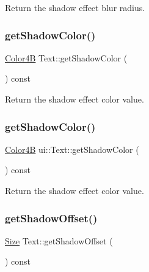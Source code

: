 Return the shadow effect blur radius. \mbox{\label{classui_1_1Text_a7f10cfa20f088433f478f7d87eaecbd5}} 
\subsubsection{\texorpdfstring{get\+Shadow\+Color()}{getShadowColor()}\hspace{0.1cm}{\footnotesize\ttfamily [1/2]}}
{\footnotesize\ttfamily \hyperlink{structColor4B}{Color4B} Text\+::get\+Shadow\+Color (\begin{DoxyParamCaption}{ }\end{DoxyParamCaption}) const}

Return the shadow effect color value. \mbox{\label{classui_1_1Text_a9db20ba9bf8aca14d1af3d4ab479378d}} 
\subsubsection{\texorpdfstring{get\+Shadow\+Color()}{getShadowColor()}\hspace{0.1cm}{\footnotesize\ttfamily [2/2]}}
{\footnotesize\ttfamily \hyperlink{structColor4B}{Color4B} ui\+::\+Text\+::get\+Shadow\+Color (\begin{DoxyParamCaption}{ }\end{DoxyParamCaption}) const}

Return the shadow effect color value. \mbox{\label{classui_1_1Text_a2b38813a4904e5a091ce5ea4db5e3b3b}} 
\subsubsection{\texorpdfstring{get\+Shadow\+Offset()}{getShadowOffset()}\hspace{0.1cm}{\footnotesize\ttfamily [1/2]}}
{\footnotesize\ttfamily \hyperlink{classSize}{Size} Text\+::get\+Shadow\+Offset (\begin{DoxyParamCaption}{ }\end{DoxyParamCaption}) const}

